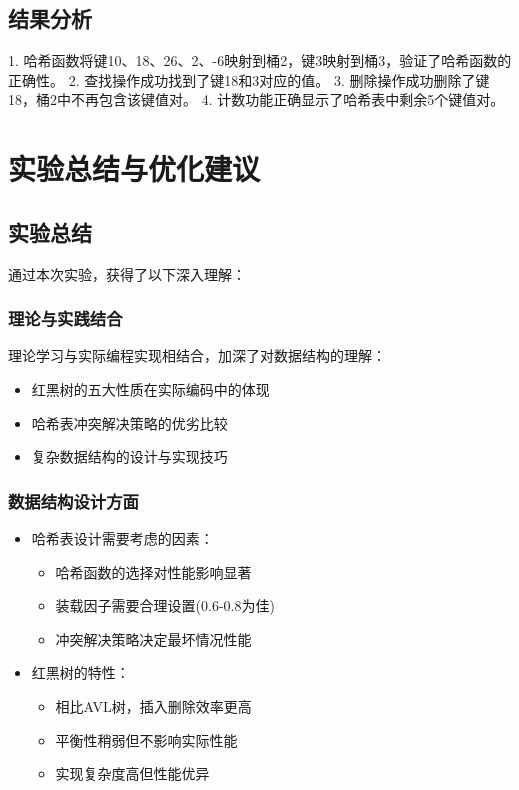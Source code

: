 \documentclass[12pt,a4paper]{article}
\begin{document}
\subsection{结果分析}
1. 哈希函数将键10、18、26、2、-6映射到桶2，键3映射到桶3，验证了哈希函数的正确性。
2. 查找操作成功找到了键18和3对应的值。
3. 删除操作成功删除了键18，桶2中不再包含该键值对。
4. 计数功能正确显示了哈希表中剩余5个键值对。

\section{实验总结与优化建议}

\subsection{实验总结}
通过本次实验，获得了以下深入理解：

\subsubsection{理论与实践结合}
理论学习与实际编程实现相结合，加深了对数据结构的理解：
\begin{itemize}
\item 红黑树的五大性质在实际编码中的体现
\item 哈希表冲突解决策略的优劣比较
\item 复杂数据结构的设计与实现技巧
\end{itemize}

\subsubsection{数据结构设计方面}
\begin{itemize}
\item 哈希表设计需要考虑的因素：
  \begin{itemize}
  \item 哈希函数的选择对性能影响显著
  \item 装载因子需要合理设置(0.6-0.8为佳)
  \item 冲突解决策略决定最坏情况性能
  \end{itemize}
\item 红黑树的特性：
  \begin{itemize}
  \item 相比AVL树，插入删除效率更高
  \item 平衡性稍弱但不影响实际性能
  \item 实现复杂度高但性能优异
  \end{itemize}
\end{itemize}
\end{document}
